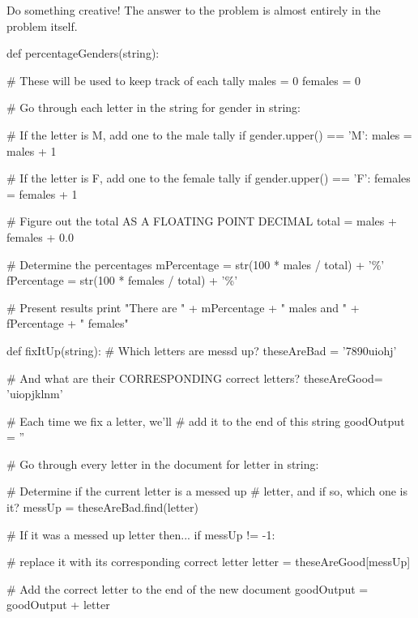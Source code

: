 \begin{exercises}
\begin{ex} %
Do something creative! The answer to the problem is almost entirely in the
problem itself.
\end{ex}

\begin{ex} %
\begin{example}
def percentageGenders(string):
  
  # These will be used to keep track of each tally
  males = 0
  females = 0
  
  # Go through each letter in the string
  for gender in string:
  
    # If the letter is M, add one to the male tally
    if gender.upper() == 'M':
      males = males + 1
    
    # If the letter is F, add one to the female tally
    if gender.upper() == 'F':
      females = females + 1
  
  # Figure out the total AS A FLOATING POINT DECIMAL
  total = males + females + 0.0
  
  # Determine the percentages
  mPercentage = str(100 * males / total) + '\%'
  fPercentage = str(100 * females / total) + '\%'
  
  # Present results
  print "There are " + mPercentage + " males and " + fPercentage + " females"
\end{example}
\end{ex}

\begin{ex} %
\begin{example}
def fixItUp(string):
  # Which letters are messd up?
  theseAreBad = '7890uiohj'
  
  # And what are their CORRESPONDING correct letters?
  theseAreGood= 'uiopjklnm'
  
  # Each time we fix a letter, we'll
  # add it to the end of this string
  goodOutput = ''
  
  # Go through every letter in the document
  for letter in string:

    # Determine if the current letter is a messed up
    # letter, and if so, which one is it?  
    messUp = theseAreBad.find(letter)

    # If it was a messed up letter then...    
    if messUp != -1:
    
      # replace it with its corresponding correct letter
      letter = theseAreGood[messUp]
    
    # Add the correct letter to the end of the new document
    goodOutput = goodOutput + letter
    

\end{example}
\end{ex}
\end{exercises}
